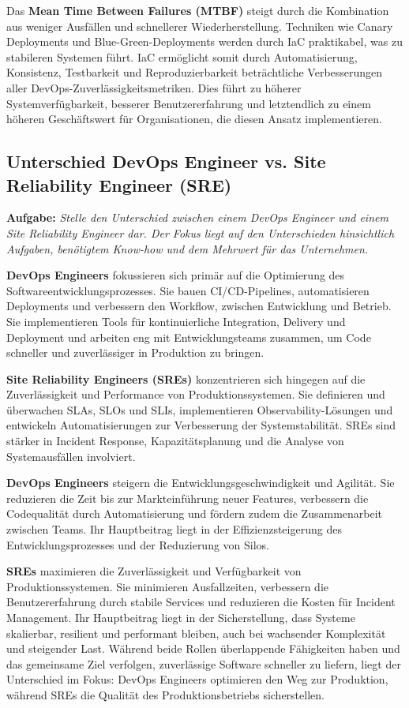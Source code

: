 Das \textbf{Mean Time Between Failures (MTBF)} steigt durch die Kombination aus weniger Ausfällen
und schnellerer Wiederherstellung. Techniken wie Canary Deployments und Blue-Green-Deployments
werden durch IaC praktikabel, was zu stabileren Systemen führt. IaC ermöglicht somit durch
Automatisierung, Konsistenz, Testbarkeit und Reproduzierbarkeit beträchtliche Verbesserungen
aller DevOps-Zuverlässigkeitsmetriken. Dies führt zu höherer Systemverfügbarkeit, besserer
Benutzererfahrung und letztendlich zu einem höheren Geschäftswert für Organisationen, die
diesen Ansatz implementieren. \\
\cite{centron_iac,aws_iac}

\newpage

\subsection{Unterschied DevOps Engineer vs. Site Reliability Engineer (SRE)}
\textbf{Aufgabe:} \textit{Stelle den Unterschied zwischen einem DevOps Engineer und einem Site
Reliability Engineer dar. Der Fokus liegt auf den Unterschieden hinsichtlich Aufgaben,
benötigtem Know-how und dem Mehrwert für das Unternehmen.}

\textbf{DevOps Engineers} fokussieren sich primär auf die Optimierung des Softwareentwicklungsprozesses.
Sie bauen CI/CD-Pipelines, automatisieren Deployments und verbessern den Workflow, zwischen
Entwicklung und Betrieb. Sie implementieren Tools für kontinuierliche Integration, Delivery und
Deployment und arbeiten eng mit Entwicklungsteams zusammen, um Code schneller und zuverlässiger in
Produktion zu bringen.

\textbf{Site Reliability Engineers (SREs)} konzentrieren sich hingegen auf die Zuverlässigkeit
und Performance von Produktionssystemen. Sie definieren und überwachen SLAs, SLOs und SLIs,
implementieren Observability-Lösungen und entwickeln Automatisierungen zur Verbesserung der
Systemstabilität. SREs sind stärker in Incident Response, Kapazitätsplanung und die Analyse von
Systemausfällen involviert.

\textbf{DevOps Engineers} steigern die Entwicklungsgeschwindigkeit und Agilität. Sie reduzieren
die Zeit bis zur Markteinführung neuer Features, verbessern die Codequalität durch Automatisierung
und fördern zudem die Zusammenarbeit zwischen Teams. Ihr Hauptbeitrag liegt in der
Effizienzsteigerung des Entwicklungsprozesses und der Reduzierung von Silos.

\textbf{SREs} maximieren die Zuverlässigkeit und Verfügbarkeit von Produktionssystemen.
Sie minimieren Ausfallzeiten, verbessern die Benutzererfahrung durch stabile Services und
reduzieren die Kosten für Incident Management. Ihr Hauptbeitrag liegt in der Sicherstellung,
dass Systeme skalierbar, resilient und performant bleiben, auch bei wachsender Komplexität und
steigender Last.
Während beide Rollen überlappende Fähigkeiten haben und das gemeinsame Ziel verfolgen, zuverlässige
Software schneller zu liefern, liegt der Unterschied im Fokus: DevOps Engineers optimieren den
Weg zur Produktion, während SREs die Qualität des Produktionsbetriebs sicherstellen.
\cite{netapp_sre,brokee_sre}